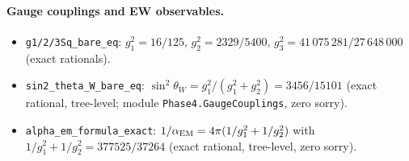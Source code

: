 \documentclass[11pt]{article}
\theoremstyle{remark}
\begin{document}
\begin{appendices}
\paragraph{Gauge couplings and EW observables.}
\begin{itemize}[leftmargin=1.2em,itemsep=0.1em,topsep=0.2em]
  \item \texttt{g1/2/3Sq\_bare\_eq}: $g_1^2 = 16/125$, $g_2^2 = 2329/5400$, $g_3^2 = 41\,075\,281/27\,648\,000$ (exact rationals).
  \item \texttt{sin2\_theta\_W\_bare\_eq}: $\sin^2\!\theta_W = g_1^2/(g_1^2+g_2^2) = 3456/15101$ (exact rational, tree-level; module \texttt{Phase4.GaugeCouplings}, zero sorry).
  \item \texttt{alpha\_em\_formula\_exact}: $1/\alpha_{\rm EM} = 4\pi(1/g_1^2 + 1/g_2^2)$ with $1/g_1^2 + 1/g_2^2 = 377525/37264$ (exact rational, tree-level, zero sorry).
\end{itemize}


\end{appendices}
\end{document}

